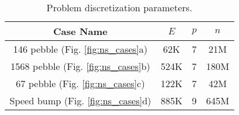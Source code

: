 \begin{table}
\centering
\begin{tabular}{||c| c c c ||}
  \hline
  Case Name & $E$ & $p$ & $n$\\
  \hline\hline
  146 pebble  (Fig. \ref{fig:ns_cases}a) & 62K & 7 & 21M\\
  1568 pebble (Fig. \ref{fig:ns_cases}b) & 524K & 7 & 180M\\
  67 pebble   (Fig. \ref{fig:ns_cases}c) & 122K & 7 & 42M\\
  Speed bump  (Fig. \ref{fig:ns_cases}d) & 885K & 9 & 645M\\
\hline
\end{tabular}
\caption{
  \small
  Problem discretization parameters.
  \label{table:problem-sizes}
}
\end{table}